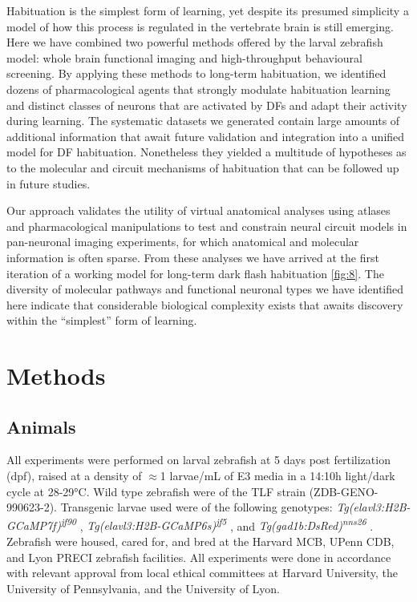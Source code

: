 \documentclass[9pt,lineno]{RandlettLab_elife}
\begin{document}
Habituation is the simplest form of learning, yet despite its presumed simplicity a model of how this process is regulated in the vertebrate brain is still emerging. Here we have combined two powerful methods offered by the larval zebrafish model: whole brain functional imaging and high-throughput behavioural screening. By applying these methods to long-term habituation, we identified dozens of pharmacological agents that strongly modulate habituation learning and distinct classes of neurons that are activated by DFs and adapt their activity during learning. The systematic datasets we generated contain large amounts of additional information that await future validation and integration into a unified model for DF habituation. Nonetheless they yielded a multitude of hypotheses as to the molecular and circuit mechanisms of habituation that can be followed up in future studies. 

Our approach validates the utility of virtual anatomical analyses using atlases and pharmacological manipulations to test and constrain neural circuit models in pan-neuronal imaging experiments, for which anatomical and molecular information is often sparse. From these analyses we have arrived at the first iteration of a working model for long-term dark flash habituation \autoref{fig:8}. The diversity of molecular pathways and functional neuronal types we have identified here indicate that considerable biological complexity exists that awaits discovery within the “simplest” form of learning. 

\section{Methods}

\subsection{Animals}

All experiments were performed on larval zebrafish at 5 days post fertilization (dpf), raised at a density of $\approx$1 larvae/mL of E3 media in a 14:10h light/dark cycle at 28-29°C. Wild type zebrafish were of the TLF strain (ZDB-GENO-990623-2). Transgenic larvae used were of the following genotypes: \emph{Tg(elavl3:H2B-GCaMP7f)\textsuperscript{jf90}} \citep{Yang2021-uf}, \emph{Tg(elavl3:H2B-GCaMP6s)\textsuperscript{jf5}} \citep{Freeman2014-yo}, and \emph{Tg(gad1b:DsRed)\textsuperscript{nns26}} \citep{Satou2013-pp}. Zebrafish were housed, cared for, and bred at the Harvard MCB, UPenn CDB, and Lyon PRECI zebrafish facilities. All experiments were done in accordance with relevant approval from local ethical committees at Harvard University, the University of Pennsylvania, and the University of Lyon. 
\end{document}
